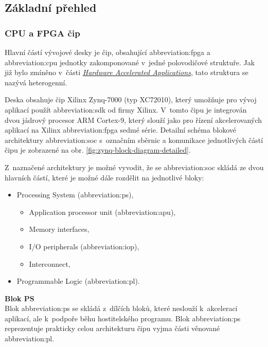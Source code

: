 \documentclass[a4paper, twoside, 11pt]{article}
\begin{document}
		\subsection{Základní přehled}
		\subsubsection{CPU a FPGA čip}
			Hlavní částí vývojové desky je čip, obsahující \gls{abbreviation:fpga} a \gls{abbreviation:cpu} jednotky zakomponované v~jedné polovodičové struktuře. Jak již bylo zmíněno v~části \hyperref[subsec:hardware-accelerated-applications]{\textit{Hardware Accelerated Applications}}, tato struktura se nazývá heterogenní.\par
			Deska obsahuje čip Xilinx Zynq-7000 (typ XC72010), který umožňuje pro vývoj aplikací použít \gls{abbreviation:sdk} od firmy Xilinx. V~tomto čipu je integrován dvou jádrový procesor ARM Cortex-9, který slouží jako pro řízení akcelerovaných aplikací na Xilinx \gls{abbreviation:fpga} sedmé série. Detailní schéma blokové architektury \gls{abbreviation:soc} s~označním sběrnic a komunikace jednotlivých částí čipu je zobrazené na obr. \ref{fig:zynq-block-diagram-detailed}.\par
			Z~naznačené architektury je možné vyvodit, že se \gls{abbreviation:soc} skládá ze dvou hlavních částí, které je možné dále rozdělit na jednotlivé bloky:
			\begin{itemize}
				\item Processing System (\gls{abbreviation:ps}),
				\begin{itemize}
					\item Application processor unit (\gls{abbreviation:apu}),
					\item Memory interfaces,
					\item I/O peripherals (\gls{abbreviation:iop}),
					\item Interconnect,
				\end{itemize}
				\item Programmable Logic (\gls{abbreviation:pl}).
			\end{itemize}
			\vspace*{0.25cm}
			\noindent\textbf{Blok PS}\\
			Blok \gls{abbreviation:ps} se skládá z~dílčích bloků, které neslouží k~akceleraci aplikací, ale k~podpoře běhu hostitelského programu. Blok \gls{abbreviation:ps} reprezentuje prakticky celou architekturu čipu vyjma části věnované \gls{abbreviation:pl}.\par\vspace*{0.25cm}
\end{document}
